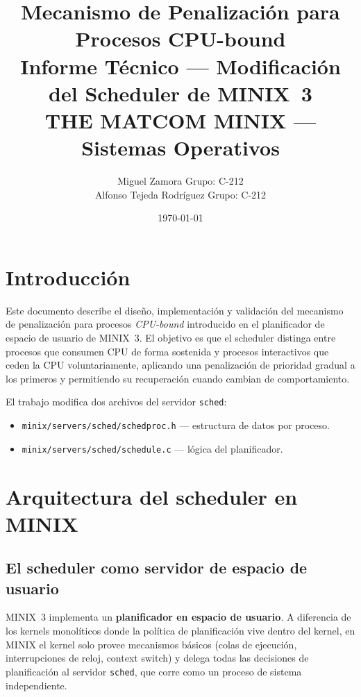 \documentclass[11pt,a4paper]{article}
\title{
  \textbf{Mecanismo de Penalizaci\'on para Procesos CPU-bound}\\[0.5em]
  \large Informe T\'ecnico --- Modificaci\'on del Scheduler de MINIX~3\\[0.3em]
  \normalsize THE MATCOM MINIX --- Sistemas Operativos
}
\author{
  Miguel Zamora \quad Grupo: C-212\\
  Alfonso Tejeda Rodr\'iguez \quad Grupo: C-212
}
\date{\today}
\begin{document}
\sloppy          %
\maketitle
\tableofcontents
\newpage

\section{Introducci\'on}

Este documento describe el dise\~no, implementaci\'on y validaci\'on del mecanismo de
penalizaci\'on para procesos \emph{CPU-bound} introducido en el planificador de espacio
de usuario de MINIX~3. El objetivo es que el scheduler distinga entre procesos que
consumen CPU de forma sostenida y procesos interactivos que ceden la CPU voluntariamente,
aplicando una penalizaci\'on de prioridad gradual a los primeros y permitiendo su
recuperaci\'on cuando cambian de comportamiento.

El trabajo modifica dos archivos del servidor \texttt{sched}:
\begin{itemize}[leftmargin=*]
  \item \texttt{minix/servers/sched/schedproc.h} --- estructura de datos por proceso.
  \item \texttt{minix/servers/sched/schedule.c} --- l\'ogica del planificador.
\end{itemize}

\section{Arquitectura del scheduler en MINIX}

\subsection{El scheduler como servidor de espacio de usuario}

MINIX~3 implementa un \textbf{planificador en espacio de usuario}. A diferencia de los
kernels monol\'iticos donde la pol\'itica de planificaci\'on vive dentro del kernel, en
MINIX el kernel solo provee mecanismos b\'asicos (colas de ejecuci\'on, interrupciones
de reloj, context switch) y delega todas las decisiones de planificaci\'on al servidor
\texttt{sched}, que corre como un proceso de sistema independiente.
\end{document}
